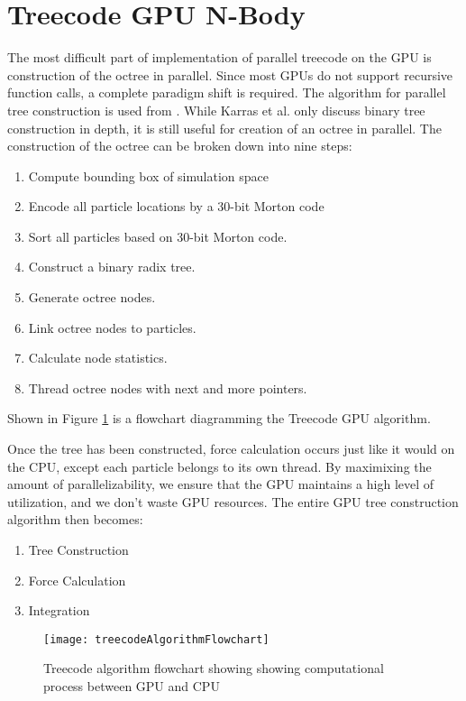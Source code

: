 \documentclass{thesis}
\begin{document}
\section{Treecode GPU N-Body}
The most difficult part of implementation of parallel treecode on the GPU is construction of the octree in parallel. Since most GPUs do not support recursive function calls, a complete paradigm shift is required. The algorithm for parallel tree construction is used from \cite{karras:2012}. While Karras et al. only discuss binary tree construction in depth, it is still useful for creation of an octree in parallel. The construction of the octree can be broken down into nine steps:
\begin{enumerate}[noitemsep]
    \item Compute bounding box of simulation space
    \item Encode all particle locations by a 30-bit Morton code
    \item Sort all particles based on 30-bit Morton code.
    \item Construct a binary radix tree.
    \item Generate octree nodes.
    \item Link octree nodes to particles.
    \item Calculate node statistics.
    \item Thread octree nodes with next and more pointers.
\end{enumerate}
Shown in Figure \ref{fig:GPUTreecodeAlg} is a flowchart diagramming the Treecode GPU algorithm.

Once the tree has been constructed, force calculation occurs just like it would on the CPU, except each particle belongs to its own thread. By maximixing the amount of parallelizability, we ensure that the GPU maintains a high level of utilization, and we don't waste GPU resources. The entire GPU tree construction algorithm then becomes:
\begin{enumerate}[noitemsep]
    \item Tree Construction
    \item Force Calculation
    \item Integration
\end{enumerate}
\begin{figure}[h]
    \caption{Treecode algorithm flowchart showing showing computational process between GPU and CPU}
    \label{fig:GPUTreecodeAlg}
    \centering
    \texttt{[image: treecodeAlgorithmFlowchart]}
\end{figure}
\end{document}

